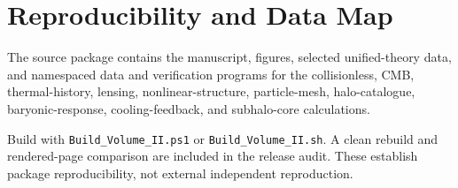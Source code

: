 \chapter{Reproducibility and Data Map}
The source package contains the manuscript, figures, selected unified-theory data, and namespaced data and verification programs for the collisionless, CMB, thermal-history, lensing, nonlinear-structure, particle-mesh, halo-catalogue, baryonic-response, cooling-feedback, and subhalo-core calculations.

Build with \texttt{Build\_Volume\_II.ps1} or \texttt{Build\_Volume\_II.sh}. A clean rebuild and rendered-page comparison are included in the release audit. These establish package reproducibility, not external independent reproduction.
